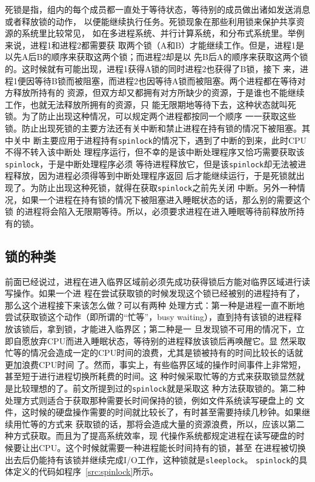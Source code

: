 \documentclass{swfcthesismscctex}
\begin{document}
死锁是指，组内的每个成员都一直处于等待状态，等待别的成员做出诸如发送消息或者释放锁的动作，
以便能继续执行任务\cite{Coulouris12}。死锁现象在那些利用锁来保护共享资源的系统里比较常见，
如在多进程系统、并行计算系统，和分布式系统里\cite{padua11}。举例来说，进程1和进程2都需要获
取两个锁（A和B）才能继续工作。但是，进程1是以先A后B的顺序来获取这两个锁；而进程2却是以
先B后A的顺序来获取这两个锁的。这时候就有可能出现，进程1获得A锁的同时进程2也获得了B锁，接下
来，进程1便因等待B锁而被阻塞，而进程2也因等待A锁而被阻塞。两个进程都在等待对方释放所持有的
资源，但双方却又都拥有对方所缺少的资源，于是谁也不能继续工作，也就无法释放所拥有的资源，只
能无限期地等待下去，这种状态就叫死锁。为了防止出现这种情况，可以规定两个进程都按同一个顺序
一一获取这些锁。防止出现死锁的主要方法还有关中断和禁止进程在持有锁的情况下被阻塞。其中关中
断主要应用于进程持有\texttt{spinlock}的情况下，遇到了中断的到来，此时CPU不得不转入该中断处
理程序运行，但不幸的是该中断处理程序又恰巧需要获取该\texttt{spinlock}，于是中断处理程序必须
等待进程释放它，但是该\texttt{spinlock}却无法被进程释放，因为进程必须得等到中断处理程序返回
后才能继续运行，于是死锁就出现了。为防止出现这种死锁，就得在获取\texttt{spinlock}之前先关闭
中断。另外一种情况，如果一个进程在持有锁的情况下被阻塞进入睡眠状态的话，那么别的需要这个锁
的进程将会陷入无限期等待。所以，必须要求进程在进入睡眠等待前释放所持有的锁。

\subsection{锁的种类}

前面已经说过，进程在进入临界区域前必须先成功获得锁后方能对临界区域进行读写操作。如果一个进
程在尝试获取锁的时候发现这个锁已经被别的进程持有了，那么这个进程接下来该怎么做？可以有两种
处理方式：第一种是进程一直不断地尝试获取锁这个动作（即所谓的``忙等''，busy
waiting）\cite{wiki:Busywating}，直到持有该锁的进程释放该锁后，拿到锁，才能进入临界区；第二种是一
旦发现锁不可用的情况下，立即自愿放弃CPU而进入睡眠状态，等待别的进程释放该锁后再唤醒它。显
然采取忙等的情况会造成一定的CPU时间的浪费，尤其是锁被持有的时间比较长的话就更加浪费CPU时间
了。然而，事实上，有些临界区域的操作时间事件上非常短，甚至短于进行进程切换所耗费的时间。这
种时候采取忙等的方式来获取锁显然就是比较理想的了。前文所提到过的\texttt{spinlock}就是采取这
种方法获取锁的。第二种处理方式则适合于获取那种需要长时间保持的锁，例如文件系统读写硬盘上的
文件，这时候的硬盘操作需要的时间就比较长了，有时甚至需要持续几秒钟。如果继续用忙等的方式来
获取锁的话，那将会造成大量的资源浪费，所以，应该以第二种方式获取。而且为了提高系统效率，现
代操作系统都规定进程在读写硬盘的时候要让出CPU。这个时候就需要一种进程能长时间持有的锁，甚至
在进程被切换出去后仍能持有该锁并继续完成I/O工作，这种锁就是\texttt{sleeplock}。
\texttt{spinlock}的具体定义的代码如程序~\ref{src:spinlock}所示。 
\end{document}

